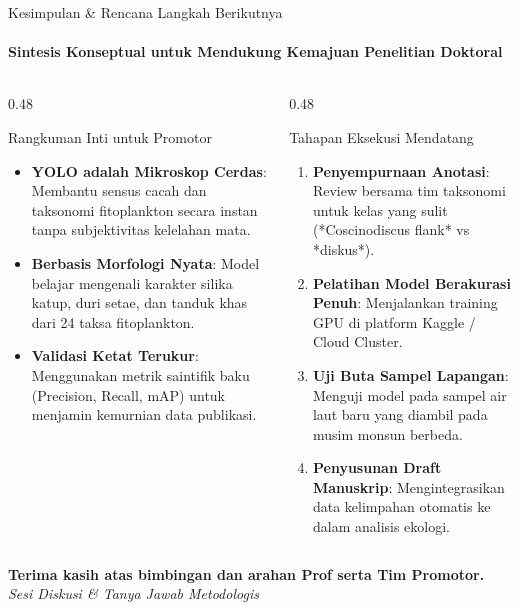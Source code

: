 \documentclass[aspectratio=169, 10pt]{beamer}
\begin{document}
\begin{frame}{Kesimpulan \& Rencana Langkah Berikutnya}
    \framesubtitle{Sintesis Konseptual untuk Mendukung Kemajuan Penelitian Doktoral}
    
    \begin{columns}[T]
        \begin{column}{0.48\textwidth}
            \begin{biocard}{Rangkuman Inti untuk Promotor}
                \scriptsize
                \begin{itemize}\setlength\itemsep{3pt}
                    \item \textbf{YOLO adalah Mikroskop Cerdas}: Membantu sensus cacah dan taksonomi fitoplankton secara instan tanpa subjektivitas kelelahan mata.
                    \item \textbf{Berbasis Morfologi Nyata}: Model belajar mengenali karakter silika katup, duri setae, dan tanduk khas dari 24 taksa fitoplankton.
                    \item \textbf{Validasi Ketat Terukur}: Menggunakan metrik saintifik baku (Precision, Recall, mAP) untuk menjamin kemurnian data publikasi.
                \end{itemize}
            \end{biocard}
        \end{column}
        
        \begin{column}{0.48\textwidth}
            \begin{conceptcard}{Tahapan Eksekusi Mendatang}
                \scriptsize
                \begin{enumerate}\setlength\itemsep{3pt}
                    \item \textbf{Penyempurnaan Anotasi}: Review bersama tim taksonomi untuk kelas yang sulit (*Coscinodiscus flank* vs *diskus*).
                    \item \textbf{Pelatihan Model Berakurasi Penuh}: Menjalankan training GPU di platform Kaggle / Cloud Cluster.
                    \item \textbf{Uji Buta Sampel Lapangan}: Menguji model pada sampel air laut baru yang diambil pada musim monsun berbeda.
                    \item \textbf{Penyusunan Draft Manuskrip}: Mengintegrasikan data kelimpahan otomatis ke dalam analisis ekologi.
                \end{enumerate}
            \end{conceptcard}
        \end{column}
    \end{columns}
    
    \vspace{6pt}
    \centering
    \scriptsize\color{OceanDeep}\textbf{Terima kasih atas bimbingan dan arahan Prof serta Tim Promotor.}\\[1mm]
    \footnotesize\color{MutedText}\textit{Sesi Diskusi \& Tanya Jawab Metodologis}
\end{frame}
\end{document}
